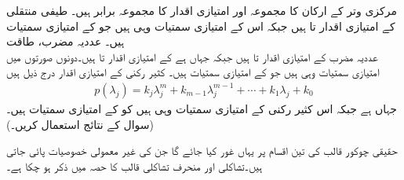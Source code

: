 مرکزی وتر کے ارکان کا مجموعہ اور امتیازی اقدار کا مجموعہ برابر ہیں۔
\quad طیفی منتقلی\\
 کے امتیازی اقدار  تا   ہیں جبکہ اس کے امتیازی سمتیات وہی ہیں جو  کے امتیازی سمتیات ہیں۔
\quad عددیہ مضرب، طاقت\\
عددیہ مضرب  کے امتیازی اقدار  تا  ہیں جبکہ  جہاں  ہے کے امتیازی اقدار  تا  ہیں۔دونوں صورتوں میں امتیازی سمتیات وہی ہیں جو  کے امتیازی سمتیات ہیں۔
کثیر رکنی  کے امتیازی اقدار درج ذیل ہیں
\begin{align*}
p(\lambda_j)=k_j\lambda_j^m+k_{m-1}\lambda_j^{m-1}+\cdots+k_1\lambda_j+k_0
\end{align*}
جہاں  ہے جبکہ اس کثیر رکنی کے امتیازی سمتیات وہی ہیں کو  کے امتیازی سمتیات ہیں۔(سوال  کے نتائج استعمال کریں۔)

حقیقی چوکور قالب کی تین اقسام پر یہاں غور کیا جائے گا جن کی غیر معمولی خصوصیات پائی جاتی ہیں۔تشاکلی اور منحرف تشاکلی قالب کا حصہ  میں ذکر ہو چکا ہے۔

